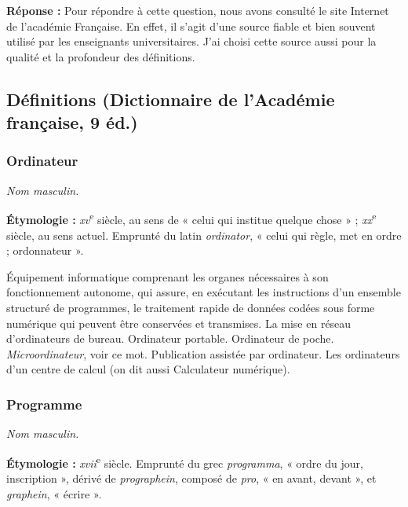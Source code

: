 \begin{graybox}
    \textbf{Réponse :}
    Pour répondre à cette question, nous avons consulté le site Internet de
    l'académie Française. En effet, il s'agit d'une source fiable et bien souvent
    utilisé par les enseignants universitaires. J'ai choisi cette source aussi
    pour la qualité et la profondeur des définitions.

    \newpage

    \subsection{Définitions (Dictionnaire de l'Académie française, 9\ieme{} éd.)}

    \subsubsection{Ordinateur}

    \textit{Nom masculin.} \parencite{acfr_ordinateur}

    \textbf{Étymologie :} \textit{xv}\textsuperscript{e} siècle, au sens de
    « celui qui institue quelque chose » ; \textit{xx}\textsuperscript{e}
    siècle, au sens actuel. Emprunté du latin \textit{ordinator}, « celui qui
    règle, met en ordre ; ordonnateur ».

    Équipement informatique comprenant les organes nécessaires à son
    fonctionnement autonome, qui assure, en exécutant les instructions d'un
    ensemble structuré de programmes, le traitement rapide de données codées
    sous forme numérique qui peuvent être conservées et transmises. La mise en
    réseau d'ordinateurs de bureau. Ordinateur portable. Ordinateur de poche.
    \textit{Microordinateur}, voir ce mot. Publication assistée par ordinateur.
    Les ordinateurs d'un centre de calcul (on dit aussi Calculateur numérique).

    \subsubsection{Programme}

    \textit{Nom masculin.} \parencite{acfr_programme}

    \textbf{Étymologie :} \textit{xvii}\textsuperscript{e} siècle. Emprunté
    du grec \textit{programma}, « ordre du jour, inscription », dérivé de
    \textit{prographein}, composé de \textit{pro}, « en avant, devant », et
    \textit{graphein}, « écrire ».


\end{graybox}
